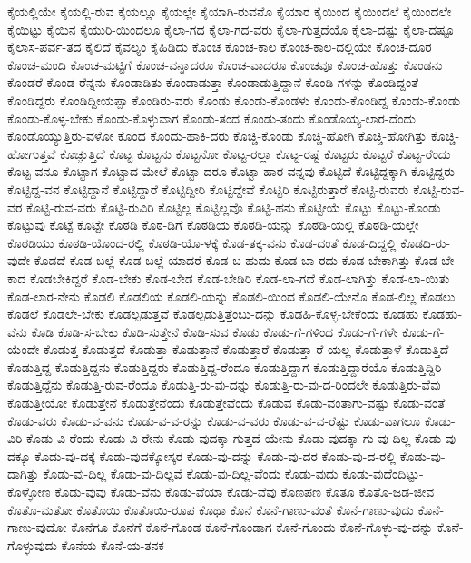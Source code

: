 ಕೈಯಲ್ಲಿಯೇ
ಕೈಯಲ್ಲಿ-ರುವ
ಕೈಯಲ್ಲೂ
ಕೈಯಲ್ಲೇ
ಕೈಯಾಗಿ-ರುವನೊ
ಕೈಯಾರ
ಕೈಯಿಂದ
ಕೈಯಿಂದಲೆ
ಕೈಯಿಂದಲೇ
ಕೈಯಿಟ್ಟು
ಕೈಯಿನ
ಕೈಯುರಿ-ಯಿಂದಲೂ
ಕೈಲಾ-ಗದ
ಕೈಲಾ-ಗದ-ವರು
ಕೈಲಾ-ಗುತ್ತದೆಯೊ
ಕೈಲಾ-ದಷ್ಟು
ಕೈಲಾ-ದಷ್ಟೂ
ಕೈಲಾಸ-ಪರ್ವ-ತದ
ಕೈಲಿದೆ
ಕೈವಲ್ಯಂ
ಕೈಹಿಡಿದು
ಕೊಂಚ
ಕೊಂಚ-ಕಾಲ
ಕೊಂಚ-ಕಾಲ-ದಲ್ಲಿಯೇ
ಕೊಂಚ-ದೂರ
ಕೊಂಚ-ಮಂದಿ
ಕೊಂಚ-ಮಟ್ಟಿಗೆ
ಕೊಂಚ-ವನ್ನಾದರೂ
ಕೊಂಚ-ವಾದರೂ
ಕೊಂಚವೂ
ಕೊಂಚ-ಹೊತ್ತು
ಕೊಂಡನು
ಕೊಂಡರೆ
ಕೊಂಡ-ರೆನ್ನನು
ಕೊಂಡಾಡಿತು
ಕೊಂಡಾಡುತ್ತಾ
ಕೊಂಡಾಡುತ್ತಿದ್ದಾನೆ
ಕೊಂಡಿ-ಗಳನ್ನು
ಕೊಂಡಿದ್ದಂತೆ
ಕೊಂಡಿದ್ದರು
ಕೊಂಡಿದ್ದೀಯಪ್ಪಾ
ಕೊಂಡಿರು-ವರು
ಕೊಂಡು
ಕೊಂಡು-ಕೊಂಡಳು
ಕೊಂಡು-ಕೊಂಡಿದ್ದ
ಕೊಂಡು-ಕೊಂಡು
ಕೊಂಡು-ಕೊಳ್ಳ-ಬೇಕು
ಕೊಂಡು-ಕೊಳ್ಳುವಾಗ
ಕೊಂಡು-ತಂದ
ಕೊಂಡು-ತಂದು
ಕೊಂಡೊಯ್ಯ-ಲಾರ-ದೆಂದು
ಕೊಂಡೊಯ್ಯುತ್ತಿರು-ವಳೋ
ಕೊಂದ
ಕೊಂದು-ಹಾಕಿ-ದರು
ಕೊಚ್ಚಿ-ಕೊಂಡು
ಕೊಚ್ಚಿ-ಹೋಗಿ
ಕೊಚ್ಚಿ-ಹೋಗಿತ್ತು
ಕೊಚ್ಚಿ-ಹೋಗುತ್ತವೆ
ಕೊಚ್ಚುತ್ತಿದೆ
ಕೊಟ್ಟ
ಕೊಟ್ಟನು
ಕೊಟ್ಟನೋ
ಕೊಟ್ಟ-ರಲ್ಲಾ
ಕೊಟ್ಟ-ರಷ್ಟೆ
ಕೊಟ್ಟರು
ಕೊಟ್ಟರೆ
ಕೊಟ್ಟ-ರೆಂದು
ಕೊಟ್ಟ-ವನೂ
ಕೊಟ್ಟಾಗ
ಕೊಟ್ಟಾದ-ಮೇಲೆ
ಕೊಟ್ಟಾ-ದರೂ
ಕೊಟ್ಟಾ-ಹಾರ-ವನ್ನವು
ಕೊಟ್ಟಿದೆ
ಕೊಟ್ಟಿದ್ದಕ್ಕಾಗಿ
ಕೊಟ್ಟಿದ್ದರು
ಕೊಟ್ಟಿದ್ದ-ವನ
ಕೊಟ್ಟಿದ್ದಾನೆ
ಕೊಟ್ಟಿದ್ದಾರೆ
ಕೊಟ್ಟಿದ್ದೀರಿ
ಕೊಟ್ಟಿದ್ದೇವೆ
ಕೊಟ್ಟಿರಿ
ಕೊಟ್ಟಿರುತ್ತಾರೆ
ಕೊಟ್ಟಿ-ರುವರು
ಕೊಟ್ಟಿ-ರುವ-ವರ
ಕೊಟ್ಟಿ-ರುವ-ವರು
ಕೊಟ್ಟಿ-ರುವಿರಿ
ಕೊಟ್ಟಿಲ್ಲ
ಕೊಟ್ಟಿಲ್ಲವೊ
ಕೊಟ್ಟಿ-ಹನು
ಕೊಟ್ಟೀಯೆ
ಕೊಟ್ಟು
ಕೊಟ್ಟು-ಕೊಂಡು
ಕೊಟ್ಟುವು
ಕೊಟ್ಟೆ
ಕೊಟ್ಟೇ
ಕೊಠಡಿ
ಕೊಠ-ಡಿಗೆ
ಕೊಠಡಿಯ
ಕೊಠಡಿ-ಯನ್ನು
ಕೊಠಡಿ-ಯಲ್ಲಿ
ಕೊಠಡಿ-ಯಲ್ಲೇ
ಕೊಠಡಿಯು
ಕೊಠಡಿ-ಯೊಂದ-ರಲ್ಲಿ
ಕೊಠಡಿ-ಯೊ-ಳಕ್ಕೆ
ಕೊಡ-ತಕ್ಕ-ವನು
ಕೊಡ-ದಂತೆ
ಕೊಡ-ದಿದ್ದಲ್ಲಿ
ಕೊಡದಿ-ರು-ವುದೇ
ಕೊಡದೆ
ಕೊಡ-ಬಲ್ಲೆ
ಕೊಡ-ಬಲ್ಲೆ-ಯಾದರೆ
ಕೊಡ-ಬ-ಹುದು
ಕೊಡ-ಬಾ-ರದು
ಕೊಡ-ಬೇಕಾಗಿತ್ತು
ಕೊಡ-ಬೇ-ಕಾದ
ಕೊಡಬೇಕಿದ್ದರೆ
ಕೊಡ-ಬೇಕು
ಕೊಡ-ಬೇಡ
ಕೊಡ-ಬೇಡಿರಿ
ಕೊಡ-ಲಾ-ಗದೆ
ಕೊಡ-ಲಾಗಿತ್ತು
ಕೊಡ-ಲಾ-ಯಿತು
ಕೊಡ-ಲಾರ-ನೇನು
ಕೊಡಲಿ
ಕೊಡಲಿಯ
ಕೊಡಲಿ-ಯನ್ನು
ಕೊಡಲಿ-ಯಿಂದ
ಕೊಡಲಿ-ಯೇನೊ
ಕೊಡ-ಲಿಲ್ಲ
ಕೊಡಲು
ಕೊಡಲೆ
ಕೊಡಲೇ-ಬೇಕು
ಕೊಡಲ್ಪಡುತ್ತವೆ
ಕೊಡಲ್ಪಡುತ್ತಿತ್ತೆಂಬು-ದನ್ನು
ಕೊಡಹಿ-ಕೊಳ್ಳ-ಬೇಕೆಂದು
ಕೊಡಹು
ಕೊಡಹು-ವೆನು
ಕೊಡಿ
ಕೊಡಿ-ಸ-ಬೇಕು
ಕೊಡಿ-ಸುತ್ತೇನೆ
ಕೊಡಿ-ಸುವ
ಕೊಡು
ಕೊಡು-ಗೆ-ಗಳಿಂದ
ಕೊಡು-ಗೆ-ಗಳೇ
ಕೊಡು-ಗೆ-ಯೆಂದೇ
ಕೊಡುತ್ತ
ಕೊಡುತ್ತದೆ
ಕೊಡುತ್ತಾ
ಕೊಡುತ್ತಾನೆ
ಕೊಡುತ್ತಾರೆ
ಕೊಡುತ್ತಾ-ರೆ-ಯಲ್ಲ
ಕೊಡುತ್ತಾಳೆ
ಕೊಡುತ್ತಿದೆ
ಕೊಡುತ್ತಿದ್ದ
ಕೊಡುತ್ತಿದ್ದನು
ಕೊಡುತ್ತಿದ್ದರು
ಕೊಡುತ್ತಿದ್ದ-ರೆಂದೂ
ಕೊಡುತ್ತಿದ್ದಾಗ
ಕೊಡುತ್ತಿದ್ದಾರೆಯೊ
ಕೊಡುತ್ತಿದ್ದಿರಿ
ಕೊಡುತ್ತಿದ್ದೆನು
ಕೊಡುತ್ತಿ-ರುವ-ರೆಂದೂ
ಕೊಡುತ್ತಿ-ರು-ವು-ದನ್ನು
ಕೊಡುತ್ತಿ-ರು-ವು-ದ-ರಿಂದಲೇ
ಕೊಡುತ್ತಿರು-ವೆವು
ಕೊಡುತ್ತೀಯೋ
ಕೊಡುತ್ತೇನೆ
ಕೊಡುತ್ತೇನೆಂದು
ಕೊಡುತ್ತೇವೆಂದು
ಕೊಡುವ
ಕೊಡು-ವಂತಾಗು-ವಷ್ಟು
ಕೊಡು-ವಂತೆ
ಕೊಡು-ವರು
ಕೊಡು-ವ-ವನು
ಕೊಡು-ವ-ವ-ರನ್ನು
ಕೊಡು-ವ-ವರು
ಕೊಡು-ವ-ವ-ರೆಷ್ಟು
ಕೊಡು-ವಾಗಲೂ
ಕೊಡು-ವಿರಿ
ಕೊಡು-ವಿ-ರೆಂದು
ಕೊಡು-ವಿ-ರೇನು
ಕೊಡು-ವುದಕ್ಕಾ-ಗುತ್ತದೆ-ಯೇನು
ಕೊಡು-ವುದಕ್ಕಾ-ಗು-ವು-ದಿಲ್ಲ
ಕೊಡು-ವು-ದಕ್ಕೂ
ಕೊಡು-ವು-ದಕ್ಕೆ
ಕೊಡು-ವುದಕ್ಕೋಸ್ಕರ
ಕೊಡು-ವು-ದನ್ನು
ಕೊಡು-ವು-ದರ
ಕೊಡು-ವು-ದ-ರಲ್ಲಿ
ಕೊಡು-ವು-ದಾಗಿತ್ತು
ಕೊಡು-ವು-ದಿಲ್ಲ
ಕೊಡು-ವು-ದಿಲ್ಲವೆ
ಕೊಡು-ವು-ದಿಲ್ಲ-ವೆಂದು
ಕೊಡು-ವುದು
ಕೊಡು-ವುದೆಂದಿಟ್ಟು-ಕೊಳ್ಳೋಣ
ಕೊಡು-ವುವು
ಕೊಡು-ವೆನು
ಕೊಡು-ವೆಯಾ
ಕೊಡು-ವೆವು
ಕೊಣಪಣ
ಕೊತೂ
ಕೊತೊ-ಜಡ-ಜೀವ
ಕೊತೊ-ಮತೋ
ಕೊತೊಯಿ
ಕೊತೊಯಿ-ರೂಪ
ಕೊಥಾ
ಕೊನೆ
ಕೊನೆ-ಗಾಣು-ವಂತೆ
ಕೊನೆ-ಗಾಣು-ವುದು
ಕೊನೆ-ಗಾಣು-ವುದೋ
ಕೊನೆಗೂ
ಕೊನೆಗೆ
ಕೊನೆ-ಗೊಂಡ
ಕೊನೆ-ಗೊಂಡಾಗ
ಕೊನೆ-ಗೊಂದು
ಕೊನೆ-ಗೊಳ್ಳು-ವು-ದನ್ನು
ಕೊನೆ-ಗೊಳ್ಳುವುದು
ಕೊನೆಯ
ಕೊನೆ-ಯ-ತನಕ
